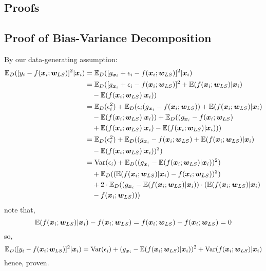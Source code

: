 \newpage
\begin{appendices}


\section{Proofs}

\subsection{Proof of Bias-Variance Decomposition} \label{proof:bv-decomp}
By our data-generating assumption:
\begin{align}
    \E_{D}([\yi - \prls]^{2} | \xui) &{} = \E_{D}([\gxi + \ei - \prls]^{2} | \xui) \\
    &= \E_{D}([\gxi + \ei - \prls]^{2} + \E(\prls | \xui) \\ & \quad - \E(\prls | \xui)) \\
    &= \E_{D}(\ei^{2}) + \E_{D}(\ei (\gxi - \prls ) + \E(\prls | \xui) \\ & \quad - \E(\prls | \xui)) + \E_{D}( (\gxi - \prls \\ & \quad +\E(\prls | \xui) - \E(\prls | \xui)) ) \\
    &= \E_{D}(\ei^{2}) + \E_{D}( (\gxi - \prls + \E(\prls | \xui) \\ & \quad - \E(\prls | \xui) )^{2}  ) \\ 
    &= \V(\ei) + \E_{D}( (\gxi - \E(\prls | \xui))^{2} ) \\ & \quad + \E_{D}( (\E(\prls | \xui) - \prls)^{2} ) \\ & \quad + 2 \cdot \E_{D}( (\gxi - \E(\prls | \xui)) \cdot (\E(\prls | \xui) \\ & \quad - \prls) )
\end{align}
note that,
\begin{equation}
    \E(\prls | \xui) - \prls = \prls - \prls = 0
\end{equation}
so,
\begin{equation}
    \E_{D}([\yi - \prls]^{2} | \xui) = \V(\ei) + (\gxi - \E(\prls | \xui) )^{2} + \V(\prls | \xui)
\end{equation}
hence, proven. 


\end{appendices}
